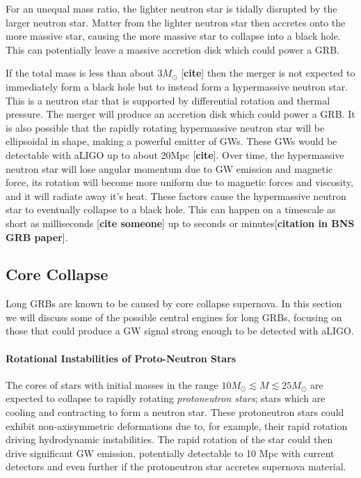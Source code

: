 \documentclass[11pt]{cuthesis}
\begin{document}
For an unequal mass ratio, the lighter neutron star is tidally disrupted by the larger neutron star. Matter from the lighter neutron star then accretes onto the more massive star, causing the more massive star to collapse into a black hole. This can potentially leave a massive accretion disk which could power a GRB.  

If the total mass is less than about 3$M_\odot$ [\textbf{cite}] then the merger is not expected to immediately form a black hole but to instead form a hypermassive neutron star. This is a neutron star that is supported by differential rotation and thermal pressure. The merger will produce an accretion disk which could power a GRB. It is also possible that the rapidly rotating hypermassive neutron star will be ellipsoidal in shape, making a powerful emitter of GWs. These GWs would be detectable with aLIGO up to about 20Mpc [\textbf{cite}]. Over time, the hypermassive neutron star will lose angular momentum due to GW emission and magnetic force, its rotation will become more uniform due to magnetic forces and viscosity, and it will radiate away it's heat. These factors cause the hypermassive neutron star to eventually collapse to a black hole. This can happen on a timescale as short as milliseconds [\textbf{cite someone}] up to seconds or minutes[\textbf{citation in BNS GRB paper}]. 

\subsection{Core Collapse}
Long GRBs are known to be caused by core collapse supernova. In this section we will discuss some of the possible central engines for long GRBs, focusing on those that could produce a GW signal strong enough to be detected with aLIGO. 

\paragraph{Rotational Instabilities of Proto-Neutron Stars} 
The cores of stars with initial masses in the range $10M_\odot \lesssim M \lesssim 25M_\odot$ are expected to collapse to rapidly rotating \textit{protoneutron stars}; stars which are cooling and contracting to form a neutron star. These protoneutron stars could exhibit non-axisymmetric deformations due to, for example, their rapid rotation driving hydrodynamic instabilities.  The rapid rotation of the star could then drive significant GW emission, potentially detectable to 10 Mpc with current detectors and even further if the protoneutron star accretes supernova material. 
\end{document}
